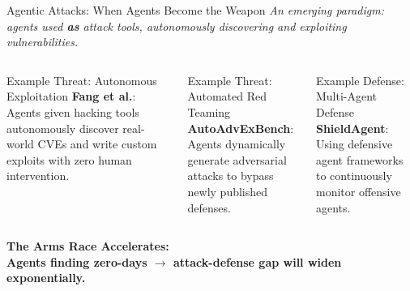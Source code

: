 \begin{frame}{Agentic Attacks: When Agents Become the Weapon}
  {\footnotesize\itshape An emerging paradigm: agents used \textbf{as} attack tools,
    autonomously discovering and exploiting vulnerabilities.}
  \vspace{0.3em}

  \begin{columns}[T]
    \begin{ucrcard}[UCRnavy]{Example Threat: Autonomous Exploitation}
      \scriptsize
      \textbf{Fang et al.}:\\
      Agents given hacking tools autonomously discover real-world CVEs and write custom exploits with zero human intervention.
    \end{ucrcard}

    \begin{ucrcard}[UCRnavy]{Example Threat: Automated Red Teaming}
      \scriptsize
      \textbf{AutoAdvExBench}:\\
      Agents dynamically generate adversarial attacks to bypass newly published defenses.
    \end{ucrcard}

    \vspace{0.3em}
    \begin{ucrcard}[UCRnavy]{Example Defense: Multi-Agent Defense}
      \scriptsize
      \textbf{ShieldAgent}:\\
      Using defensive agent frameworks to continuously monitor offensive agents.
    \end{ucrcard}
  \end{columns}
  
  \vspace{0.3em}
  \begin{ucrdark}[UCRnavy]
    \scriptsize\bfseries
    The Arms Race Accelerates:\\[3pt]
    \normalfont\scriptsize
    Agents finding zero-days $\to$ attack-defense gap will \textbf{widen exponentially}.
  \end{ucrdark}
\end{frame}


